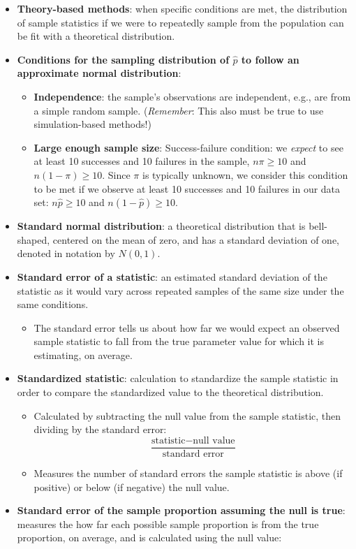 \documentclass[
]{report}
\providecommand{\tightlist}{%
  \setlength{\itemsep}{0pt}\setlength{\parskip}{0pt}}
\begin{document}
\begin{itemize}
\item
  \textbf{Theory-based methods}: when specific conditions are met, the distribution of sample statistics if we were to repeatedly sample from the population can be fit with a theoretical distribution.
\item
  \textbf{Conditions for the sampling distribution of \(\hat{p}\) to follow an approximate normal distribution}:

  \begin{itemize}
  \item
    \textbf{Independence}: the sample's observations are independent, e.g., are from a simple random sample. (\emph{Remember}: This also must be true to use simulation-based methods!)
  \item
    \textbf{Large enough sample size}: Success-failure condition: we \emph{expect} to see at least 10 successes and 10 failures in the sample, \(n\pi\geq10\) and \(n(1-\pi)\geq10\). Since \(\pi\) is typically unknown, we consider this condition to be met if we observe at least 10 successes and 10 failures in our data set: \(n\hat{p}\geq10\) and \(n(1-\hat{p})\geq10\).
  \end{itemize}
\item
  \textbf{Standard normal distribution}: a theoretical distribution that is bell-shaped, centered on the mean of zero, and has a standard deviation of one, denoted in notation by \(N(0,1)\).
\item
  \textbf{Standard error of a statistic}: an estimated standard deviation of the statistic as it would vary across repeated samples of the same size under the same conditions.

  \begin{itemize}
  \tightlist
  \item
    The standard error tells us about how far we would expect an observed sample statistic to fall from the true parameter value for which it is estimating, on average.
  \end{itemize}
\item
  \textbf{Standardized statistic}: calculation to standardize the sample statistic in order to compare the standardized value to the theoretical distribution.

  \begin{itemize}
  \item
    Calculated by subtracting the null value from the sample statistic, then dividing by the standard error:
    \[\frac{\text{statistic} - \text{null value}}{\text{standard error}}\]
  \item
    Measures the number of standard errors the sample statistic is above (if positive) or below (if negative) the null value.
  \end{itemize}
\item
  \textbf{Standard error of the sample proportion assuming the null is true}: measures the how far each possible sample proportion is from the true proportion, on average, and is calculated using the null value:
\end{itemize}
\end{document}
